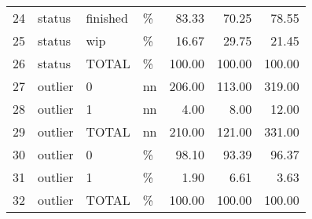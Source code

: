 \begin{sidewaystable}[ht]
\begin{tabular}{rlllrrr}
  24 & status & finished & \% & 83.33 & 70.25 & 78.55 \\ 
  25 & status & wip & \% & 16.67 & 29.75 & 21.45 \\ 
  26 & status & TOTAL & \% & 100.00 & 100.00 & 100.00 \\ 
  27 & outlier & 0 & nn & 206.00 & 113.00 & 319.00 \\ 
  28 & outlier & 1 & nn & 4.00 & 8.00 & 12.00 \\ 
  29 & outlier & TOTAL & nn & 210.00 & 121.00 & 331.00 \\ 
  30 & outlier & 0 & \% & 98.10 & 93.39 & 96.37 \\ 
  31 & outlier & 1 & \% & 1.90 & 6.61 & 3.63 \\ 
  32 & outlier & TOTAL & \% & 100.00 & 100.00 & 100.00 \\ 
   \hline
\end{tabular}
\end{sidewaystable}
